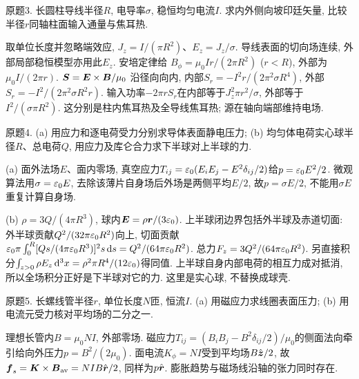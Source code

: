 \begin{exercise}
原题3. 长圆柱导线半径$R$, 电导率$\sigma$, 稳恒均匀电流$I$. 求内外侧向坡印廷矢量, 比较半径$r$同轴柱面输入通量与焦耳热.
\end{exercise}
\begin{solution}
取单位长度并忽略端效应, $J_z=I/(\pi R^2)$、$E_z=J_z/\sigma$. 导线表面的切向场连续, 外部局部稳恒模型亦用此$E_z$. 安培定律给 $B_\phi=\mu_0Ir/(2\pi R^2)$ ($r<R$), 外部为$\mu_0I/(2\pi r)$. $\boldsymbol{S}=\boldsymbol{E}\times\boldsymbol{B}/\mu_0$ 沿径向向内, 内部$S_r=-I^2r/(2\pi^2\sigma R^4)$, 外部$S_r=-I^2/(2\pi^2\sigma R^2r)$. 输入功率$-2\pi rS_r$在内部等于$J_z^2\pi r^2/\sigma$, 外部等于$I^2/(\sigma\pi R^2)$. 这分别是柱内焦耳热及全导线焦耳热; 源在轴向端部维持电场.
\end{solution}
\begin{exercise}
原题4. (a) 用应力和逐电荷受力分别求导体表面静电压力; (b) 均匀体电荷实心球半径$R$、总电荷$Q$, 用应力及库仑合力求下半球对上半球的力.
\end{exercise}
\begin{solution}
(a) 面外法场$E$、面内零场, 真空应力$T_{ij}=\varepsilon_0(E_iE_j-E^2\delta_{ij}/2)$给$p=\varepsilon_0 E^2/2$. 微观算法用$\sigma=\varepsilon_0 E$, 去除该薄片自身场后外场是两侧平均$E/2$, 故$p=\sigma E/2$, 不能用$\sigma E$重复计算自身场.

(b) $\rho=3Q/(4\pi R^3)$, 球内$\boldsymbol{E}=\rho\boldsymbol{r}/(3\varepsilon_0)$. 上半球闭边界包括外半球及赤道切面: 外半球贡献$Q^2/(32\pi\varepsilon_0 R^2)$向上, 切面贡献
$\varepsilon_0\pi\int_0^R[Qs/(4\pi\varepsilon_0 R^3)]^2s\,\mathrm d s=Q^2/(64\pi\varepsilon_0 R^2)$. 总力$F_z=3Q^2/(64\pi\varepsilon_0 R^2)$. 另直接积分$\int_{z>0}\rho E_z\,\mathrm d^3x=\rho^2\pi R^4/(12\varepsilon_0)$得同值. 上半球自身内部电荷的相互力成对抵消, 所以全场积分正好是下半球对它的力. 这里是实心球, 不替换成球壳.
\end{solution}
\begin{exercise}
原题5. 长螺线管半径$r$, 单位长度$N$匝, 恒流$I$. (a) 用磁应力求线圈表面压力; (b) 用电流元受力核对平均场的二分之一.
\end{exercise}
\begin{solution}
理想长管内$B=\mu_0NI$, 外部零场. 磁应力$T_{ij}=(B_iB_j-B^2\delta_{ij}/2)/\mu_0$的侧面法向牵引给向外压力$p=B^2/(2\mu_0)$. 面电流$K_\phi=NI$受到平均场$B\hat{\boldsymbol{z}}/2$, 故$\boldsymbol{f}_s=\boldsymbol{K}\times\boldsymbol{B}_{\rm av}=NI B\hat{\boldsymbol{r}}/2$, 同样为$p\hat{\boldsymbol{r}}$. 膨胀趋势与磁场线沿轴的张力同时存在.
\end{solution}
